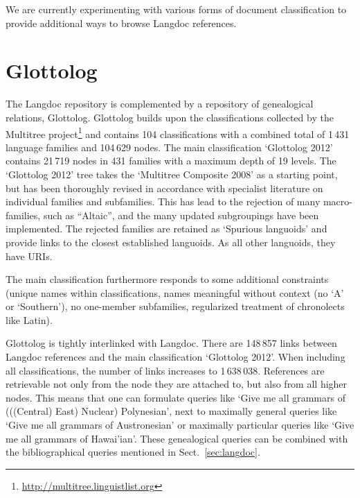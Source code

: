 \documentclass[10pt, a4paper]{article}
\begin{document}


We are currently experimenting with various forms of document classification to provide additional ways to browse Langdoc references. 


\section{Glottolog}
The Langdoc repository is complemented by a repository of genealogical
relations, Glottolog. Glottolog builds upon the classifications
collected by the Multitree
project\footnote{\url{http://multitree.linguistlist.org}} and contains
104 classifications with a combined total of 1\,431 language families
and 104\,629 nodes. The main classification `Glottolog 2012' contains
21\,719 nodes in 431 families with a maximum depth of 19 levels. The
`Glottolog 2012' tree takes the `Multitree Composite 2008' as a
starting point, but has been thoroughly revised in accordance with
specialist literature on individual families and subfamilies. This has
lead to the rejection of many macro-families, such as ``Altaic'', and
the many updated subgroupings have been implemented. The rejected
families are retained as `Spurious languoids' and provide links to the
closest established languoids. As all other languoids, they have URIs.


The main classification furthermore responds to some additional constraints (unique names within classifications,  names meaningful without context (no `A' or `Southern'), no one-member subfamilies, regularized treatment of chronolects like Latin).

Glottolog is tightly interlinked with Langdoc. There are 148\,857 links between Langdoc references and the main classification `Glottolog 2012'. When including all classifications, the number of links increases to  1\,638\,038.
References are retrievable not only from the node they are attached to, but also from all higher nodes. This means that one can formulate queries like `Give me all grammars of (((Central) East) Nuclear) Polynesian', next to maximally general queries like `Give me all grammars of Austronesian' or maximally particular queries like `Give me all grammars of Hawai'ian'. These genealogical queries can be combined with the bibliographical queries mentioned in Sect.\, \ref{sec:langdoc}.
\end{document}
